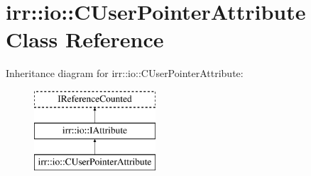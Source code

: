 \hypertarget{classirr_1_1io_1_1_c_user_pointer_attribute}{\section{irr\-:\-:io\-:\-:C\-User\-Pointer\-Attribute Class Reference}
\label{classirr_1_1io_1_1_c_user_pointer_attribute}
}
Inheritance diagram for irr\-:\-:io\-:\-:C\-User\-Pointer\-Attribute\-:\begin{figure}[H]
\begin{center}
\leavevmode
\includegraphics[height=3.000000cm]{classirr_1_1io_1_1_c_user_pointer_attribute}
\end{center}
\end{figure}
